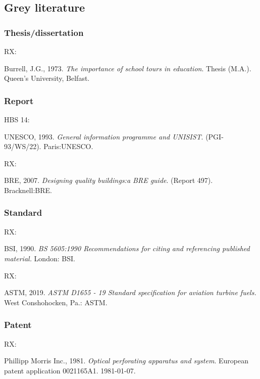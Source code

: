 \subsection{Grey literature}

\subsubsection*{Thesis/dissertation}

RX: \cite{burrell1973ist}

Burrell, J.G., 1973. \emph{The importance of school tours in education}. Thesis (M.A.). Queen's University, Belfast.



\subsubsection*{Report}

HBS 14: \cite{unesco1993gip}

UNESCO, 1993. \emph{General information programme and UNISIST}\@. (PGI-93/WS/22). Paris:\@ UNESCO.


RX: \cite{bre2007dqb}

BRE, 2007. \emph{Designing quality buildings:\@ a BRE guide}. (Report 497). Bracknell:\@ BRE.



\subsubsection*{Standard}

RX: \cite{bs5605:1990}

BSI, 1990. \emph{BS 5605:1990 Recommendations for citing and referencing
published material.} London: BSI.


RX: \cite{astm.d1655}

ASTM, 2019. \emph{ASTM D1655 - 19 Standard specification for aviation
turbine fuels.} West Conshohocken, Pa.: ASTM.



\subsubsection*{Patent}

RX: \cite{pm1981opa}

Phillipp Morris Inc., 1981. \emph{Optical perforating apparatus and system}. European patent application 0021165A1. 1981-01-07.



